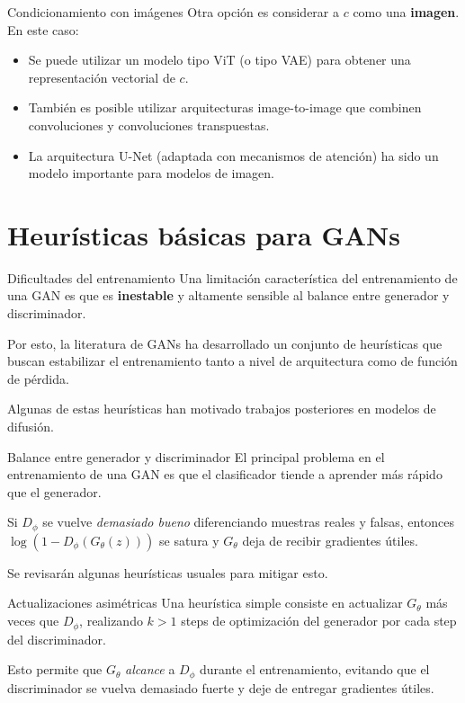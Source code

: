 \documentclass{beamer}
\begin{document}
\begin{frame}{Condicionamiento con imágenes}
    Otra opción es considerar a $c$ como una \textbf{imagen}. En este caso:
    \begin{itemize}
        \item Se puede utilizar un modelo tipo ViT (o tipo VAE) para obtener una representación vectorial de $c$.
        \item También es posible utilizar arquitecturas image-to-image que combinen convoluciones y convoluciones transpuestas.
        \item La arquitectura U-Net (adaptada con mecanismos de atención) ha sido un modelo importante para modelos de imagen.
    \end{itemize}
\end{frame}

\section{Heurísticas básicas para GANs}

\begin{frame}{Dificultades del entrenamiento}
    Una limitación característica del entrenamiento de una GAN es que es \textbf{inestable} y altamente sensible al balance entre generador y discriminador.

    Por esto, la literatura de GANs ha desarrollado un conjunto de heurísticas que buscan estabilizar el entrenamiento tanto a nivel de arquitectura como de función de pérdida.

    Algunas de estas heurísticas han motivado trabajos posteriores en modelos de difusión.
\end{frame}

\begin{frame}{Balance entre generador y discriminador}
    El principal problema en el entrenamiento de una GAN es que el clasificador tiende a aprender más rápido que el generador.

    Si $D_\phi$ se vuelve \textit{demasiado bueno} diferenciando muestras reales y falsas, entonces $\log(1-D_\phi(G_\theta(z)))$ se satura y $G_\theta$ deja de recibir gradientes útiles.

    Se revisarán algunas heurísticas usuales para mitigar esto.
\end{frame}

\begin{frame}{Actualizaciones asimétricas}
    Una heurística simple consiste en actualizar $G_\theta$ más veces que $D_\phi$, realizando $k>1$ steps de optimización del generador por cada step del discriminador.

    Esto permite que $G_\theta$ \textit{alcance} a $D_\phi$ durante el entrenamiento, evitando que el discriminador se vuelva demasiado fuerte y deje de entregar gradientes útiles.
\end{frame}
\end{document}

